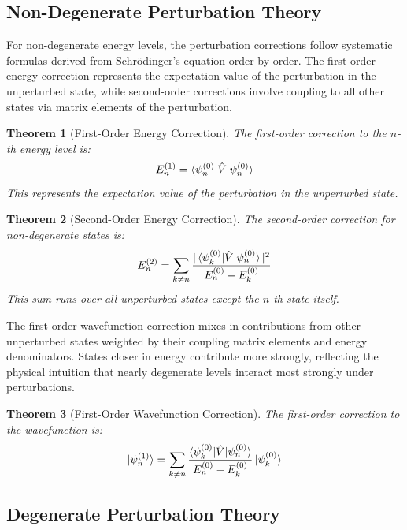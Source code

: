 \documentclass[a4paper, 11pt]{article}
\newtheorem{theorem}{Theorem}[section]
\begin{document}
\subsection{Non-Degenerate Perturbation Theory}

For non-degenerate energy levels, the perturbation corrections follow systematic
formulas derived from Schrödinger's equation order-by-order. The first-order
energy correction represents the expectation value of the perturbation in the
unperturbed state, while second-order corrections involve coupling to all other
states via matrix elements of the perturbation.

\begin{theorem}[First-Order Energy Correction]
The first-order correction to the $n$-th energy level is:
\begin{equation}
E_n^{(1)} = \braket{\psi_n^{(0)} | \hat{V} | \psi_n^{(0)}}
\end{equation}
This represents the expectation value of the perturbation in the unperturbed state.
\end{theorem}

\begin{theorem}[Second-Order Energy Correction]
The second-order correction for non-degenerate states is:
\begin{equation}
E_n^{(2)} = \sum_{k \neq n} \frac{|\braket{\psi_k^{(0)} | \hat{V} | \psi_n^{(0)}}|^2}{E_n^{(0)} - E_k^{(0)}}
\end{equation}
This sum runs over all unperturbed states except the $n$-th state itself.
\end{theorem}

The first-order wavefunction correction mixes in contributions from other
unperturbed states weighted by their coupling matrix elements and energy
denominators. States closer in energy contribute more strongly, reflecting
the physical intuition that nearly degenerate levels interact most strongly
under perturbations.

\begin{theorem}[First-Order Wavefunction Correction]
The first-order correction to the wavefunction is:
\begin{equation}
\ket{\psi_n^{(1)}} = \sum_{k \neq n} \frac{\braket{\psi_k^{(0)} | \hat{V} | \psi_n^{(0)}}}{E_n^{(0)} - E_k^{(0)}} \ket{\psi_k^{(0)}}
\end{equation}
\end{theorem}

\subsection{Degenerate Perturbation Theory}
\end{document}
